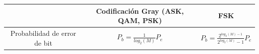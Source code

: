 \documentclass[es]{article}
\DeclareMathOperator{\sinc}{sinc}
\begin{document}
\begin{center}
    
        \renewcommand{\arraystretch}{1.5}
        \begin{tabular}{|c|c|c|}
            \hline
            & Codificación Gray (ASK, QAM, PSK) & FSK \\ 
            \hline
            Probabilidad de error de bit & $P_b = \displaystyle\frac{1}{log_2(M)} P_e$ & $P_b = \displaystyle\frac{2^{log_2(M)-1}}{2^{log_2(M)}-1} P_e$ \\
            \hline
        \end{tabular}
        \renewcommand{\arraystretch}{1} 
        \vspace{0.5cm}
    
  

\end{center}
\end{document}
